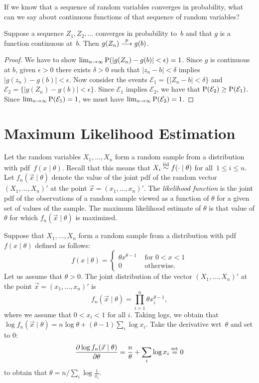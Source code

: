 If we know that a sequence of random variables converges in probability, what 
can we say about continuous functions of that sequence of random variables?
\begin{theorem}
Suppose a sequence $Z_1, Z_2, \ldots$ converges in probability to~$b$ and 
that $g$ is a function continuous at~$b$. Then $g(Z_n) \stackrel{p}{\longrightarrow} g(b)$.
\end{theorem} 
\begin{proof}
We have to show $\lim_{n \to \infty} \operatorname{P} (|g(Z_n) - g(b)| < \epsilon) = 1$. 
Since $g$ is continuous at $b$, given $\epsilon > 0$ there exists $\delta > 0$
such that $|z_n - b| < \delta$ implies $|g(z_n) -  g(b)| < \epsilon$. Now consider
the events $\mathcal{E}_1 = \{ |Z_n - b| < \delta \}$ and 
$\mathcal{E}_2 = \{|g(Z_n) - g(b)| < \epsilon\}$. Since $\mathcal{E}_1$ implies 
$\mathcal{E}_2$, we have that $\operatorname{P} (\mathcal{E}_2) \geq \operatorname{P} (\mathcal{E}_1)$. 
Since $\lim_{n \to \infty} \operatorname{P} (\mathcal{E}_1) = 1$, we must have  
$\lim_{n \to \infty} \operatorname{P} (\mathcal{E}_2) = 1$. 
\end{proof}

\section{Maximum Likelihood Estimation}
Let the random variables $X_1, \ldots, X_n$ form a random sample from a 
distribution with pdf~$f(x \mid \theta)$. Recall that this means that 
$X_i \stackrel{\text{iid}}{\sim} f( \cdot \mid \theta)$ for all~$1 \leq i \leq n$. 
Let $f_n(\vec{x} \mid \theta)$ denote the value of the joint pdf of 
the random vector $(X_1, \ldots, X_n)'$ at the point 
$\vec{x} = (x_1, \ldots, x_n)'$. The \emph{likelihood function} is the joint pdf 
of the observations of a random sample viewed as a function of $\theta$ for 
a given set of values of the sample. The maximum likelihood estimate of 
$\theta$ is that value of $\theta$ for which $f_n (\vec{x} \mid \theta)$ is 
maximized. 
\begin{example}
Suppose that $X_1, \ldots, X_n$ form a random sample from a distribution with 
pdf $f(x \mid \theta)$ defined as follows:
\[
    f(x \mid \theta) = 
        \left \{
            \begin{array}{ll}
                \theta x^{\theta - 1} & \text{ for } 0 < x < 1 \\
                0                     & \text{ otherwise}.
            \end{array} 
        \right .
\]
Let us assume that $\theta > 0$. The joint distribution of the vector 
$(X_1, \ldots, X_n)'$ at the point $\vec{x} = (x_1, \ldots, x_n)'$ is 
\[
    f_n (\vec{x} \mid \theta ) = \prod_{i = 1}^n \theta x_i^{\theta - 1},
\]
where we assume that $0 < x_i < 1$ for all $i$. Taking logs, we obtain that
$\log f_n (\vec{x} \mid \theta) = n \log \theta + (\theta - 1) \sum_i \log x_i$. 
Take the derivative wrt~$\theta$ and set to $0$:
\[
    \frac{\partial \log f_n (\vec{x} \mid \theta)}{\partial \theta} = 
        \frac{n}{\theta} + \sum_i \log x_i \stackrel{\text{set}}{=} 0
\]
to obtain that $\theta = n / \sum_i \log \frac{1}{x_i}$.
\end{example}   

